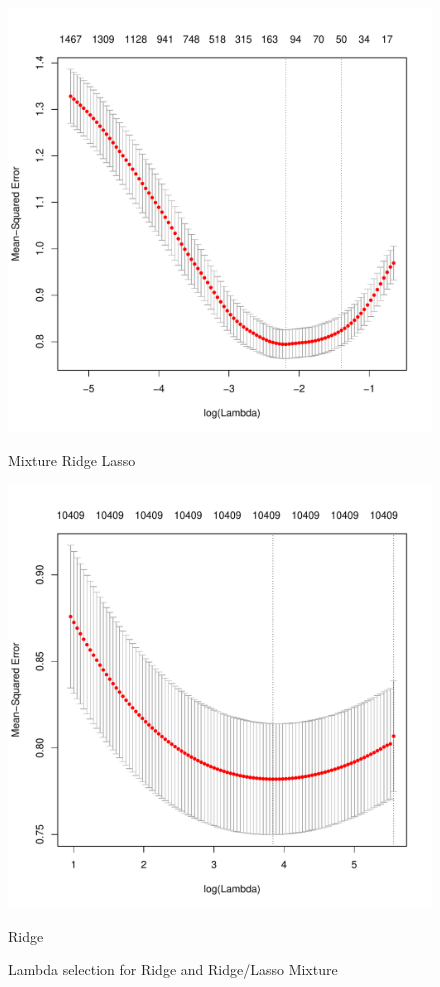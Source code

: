 \documentclass[english]{amsart}
\begin{document}
\begin{figure}[H]
  \includegraphics[width=\linewidth]{cv_lasso1_half.pdf}
  \caption{Mixture Ridge Lasso}
\endminipage\hfill
\vspace{-5mm}
  \includegraphics[width=\linewidth]{cv_ridge1.pdf}
\caption{Ridge}
\endminipage
  \caption{Lambda selection for Ridge and Ridge/Lasso Mixture}
\end{figure}
\end{document}
